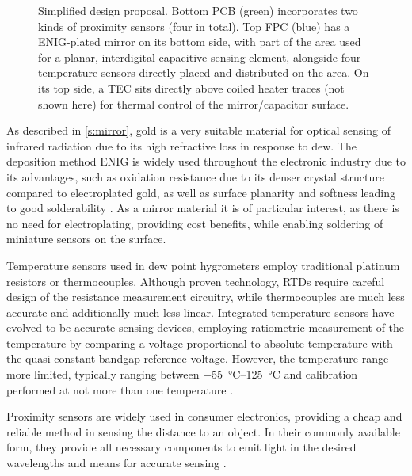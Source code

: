 \begin{figure}[h!]
        \centering
        
        \caption{Simplified design proposal. Bottom PCB (green) incorporates two kinds of proximity sensors (four in total). Top FPC (blue) has a ENIG-plated mirror on its bottom side, with part of the area used for a planar, interdigital capacitive sensing element, alongside four temperature sensors directly placed and distributed on the area. On its top side, a TEC sits directly above coiled heater traces (not shown here) for thermal control of the mirror/capacitor surface.}
        \label{d:concept_build}
\end{figure}

As described in \cref{s:mirror}, gold is a very suitable material for optical sensing of infrared radiation due to its high refractive loss in response to dew. The deposition method \Gls{ENIG} is widely used throughout the electronic industry due to its advantages, such as oxidation resistance due to its denser crystal structure compared to electroplated gold, as well as surface planarity and softness leading to good solderability \autocite{shahNovelElectrolessNickel2019}. As a mirror material it is of particular interest, as there is no need for electroplating, providing cost benefits, while enabling soldering of miniature sensors on the surface.

Temperature sensors used in dew point hygrometers employ traditional platinum resistors or thermocouples. Although proven technology, \glspl{RTD} require careful design of the resistance measurement circuitry, while thermocouples are much less accurate and additionally much less linear. Integrated temperature sensors have evolved to be accurate sensing devices, employing ratiometric measurement of the temperature by comparing a voltage proportional to absolute temperature with the quasi-constant bandgap reference voltage. However, the temperature range more limited, typically ranging between \qtyrange{-55}{125}{\celsius} and calibration performed at not more than one temperature \autocite{pertijsPrecisionTemperatureSensors2006}.

Proximity sensors are widely used in consumer electronics, providing a cheap and reliable method in sensing the distance to an object. In their commonly available form, they provide all necessary components to emit light in the desired wavelengths and means for accurate sensing 
\autocite{chapronHighlyAccurateBathroom2020a,umMultipleIntensityDifferentiation2011a}.

